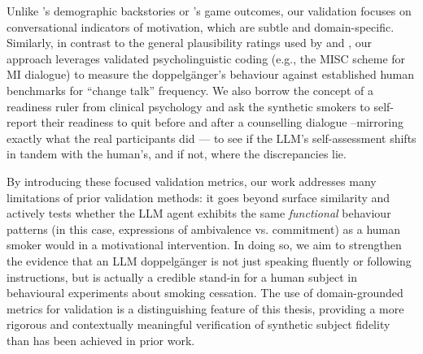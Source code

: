 Unlike \citet{argyle2023}'s demographic backstories or \citet{aher2023}'s game outcomes, our validation focuses on conversational indicators of motivation, which are subtle and domain-specific. Similarly, in contrast to the general plausibility ratings used by \citet{Cook2025} and \citet{Haider2025}, our approach leverages validated psycholinguistic coding (e.g., the MISC scheme for MI dialogue) to measure the doppelgänger's behaviour against established human benchmarks for ``change talk'' frequency. We also borrow the concept of a readiness ruler from clinical psychology and ask the synthetic smokers to self-report their readiness to quit before and after a counselling dialogue --mirroring exactly what the real participants did --- to see if the LLM's self-assessment shifts in tandem with the human's, and if not, where the discrepancies lie. 

By introducing these focused validation metrics, our work addresses many limitations of prior validation methods: it goes beyond surface similarity and actively tests whether the LLM agent exhibits the same \emph{functional} behaviour patterns (in this case, expressions of ambivalence vs. commitment) as a human smoker would in a motivational intervention. In doing so, we aim to strengthen the evidence that an LLM doppelgänger is not just speaking fluently or following instructions, but is actually a credible stand-in for a human subject in behavioural experiments about smoking cessation. The use of domain-grounded metrics for validation is a distinguishing feature of this thesis, providing a more rigorous and contextually meaningful verification of synthetic subject fidelity than has been achieved in prior work.
